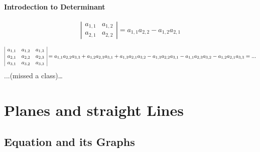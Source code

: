 \documentclass[UTF8]{ctexart}
\begin{document}
\paragraph{Introdection to Determinant}

$$
\left|\begin{array}{ll}
  a_{1,1} & a_{1,2} \\
  a_{2,1} & a_{2,2}
  \end{array}\right|=a_{1,1} a_{2,2}-a_{1,2} a_{2,1}
$$

$$
\begin{array}{|lll|l}
  a_{1,1} & a_{1,2} & a_{1,3} \\
  a_{2,1} & a_{2,2} & a_{2,3} \\
  a_{3,1} & a_{3,2} & a_{3,3}
  \end{array} 
  =a_{1,1} a_{2,2} a_{3,3}+a_{1,2} a_{2,3} a_{3,1}+a_{1,3} a_{2,1} a_{3,2}-a_{1,3} a_{2,2} a_{3,1}-a_{1,1} a_{2,3} a_{3,2}-a_{1,2} a_{2,1} a_{3,3}\\
  =...
$$
...(missed a class)\dots

\section{Planes and straight Lines}
\subsection{Equation and its Graphs}
\end{document}
